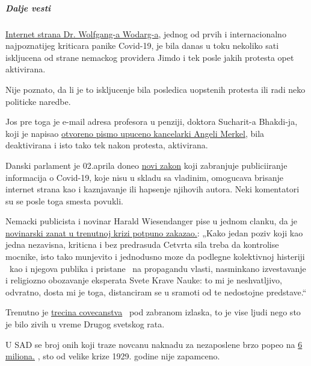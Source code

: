 \hypertarget{dalje-vesti}{%
\subparagraph{\texorpdfstring{\textbf{Dalje
vesti}}{Dalje vesti}}\label{dalje-vesti}}

\href{https://www.wodarg.com/}{Internet strana Dr. Wolfgang-a Wodarg-a},
jednog od prvih i internacionalno najpoznatijeg kriticara panike
Covid-19, je bila danas u toku nekoliko sati iskljucena od strane
nemackog providera Jimdo i tek posle jakih protesta opet aktivirana.

Nije poznato, da li je to iskljucenje bila posledica uopstenih protesta
ili radi neko politicke naredbe.

Jos pre toga je e-mail adresa profesora u penziji, doktora Sucharit-a
Bhakdi-ja, koji je napisao
\href{https://swprs.org/offener-brief-von-professor-sucharit-bhakdi-an-bundeskanzlerin-dr-angela-merkel/}{otvoreno
pismo upuceno kancelarki Angeli Merkel}, bila deaktivirana i isto tako
tek nakon protesta, aktivirana.

Danski parlament je 02.aprila doneo
\href{https://newsvoice.se/2020/04/danmark-forbjuder-corona-policy/}{novi
zakon} koji zabranjuje publiciiranje informacija o Covid-19, koje nisu u
skladu sa vladinim, omogucava brisanje internet strana kao i kaznjavanje
ili hapsenje njihovih autora. Neki komentatori su se posle toga smesta
povukli.

Nemacki publicista i novinar Harald Wiesendanger pise u jednom clanku,
da je
\href{https://www.nachrichten-fabrik.de/news/harald-wiesendanger-ueber-die-massenmedien-waehrend-der-corona-krise-ich-schaeme-mich---meines-berufsstands-152103}{novinarski
zanat u trenutnoj krizi potpuno zakazao.}: „Kako jedan poziv koji kao
jedna nezavisna, kriticna i bez predrasuda Cetvrta sila treba da
kontrolise mocnike, isto tako munjevito i jednodusno moze da podlegne
kolektivnoj histeriji ~kao i njegova publika i pristane ~na propagandu
vlasti, nasminkano izvestavanje i religiozno obozavanje eksperata Svete
Krave Nauke: to mi je neshvatljivo, odvratno, dosta mi je toga,
distanciram se u sramoti od te nedostojne predstave.``

Trenutno je
\href{https://www.sciencealert.com/one-third-of-the-world-s-population-are-now-restricted-in-where-they-can-go}{trecina
covecanstva} ~pod zabranom izlaska, to je vise ljudi nego sto je bilo
zivih u vreme Drugog svetskog rata.

U SAD se broj onih koji traze novcanu naknadu za nezaposlene brzo popeo
na
\href{https://www.reuters.com/article/us-health-coronavirus-usa-layoffs/us-weekly-jobless-claims-seen-at-record-high-again-idUSKBN21K0FX}{6
miliona.} , sto od velike krize 1929. godine nije zapamceno.

